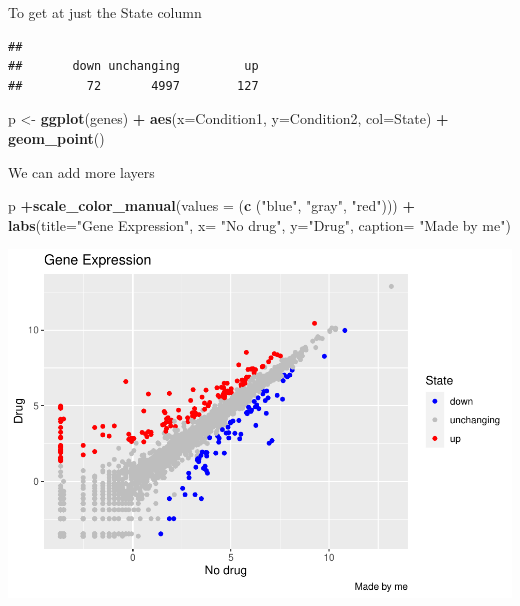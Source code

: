 \documentclass[
]{article}
\newenvironment{Shaded}{\begin{snugshade}}{\end{snugshade}}
\newcommand{\DataTypeTok}[1]{\textcolor[rgb]{0.13,0.29,0.53}{#1}}
\newcommand{\KeywordTok}[1]{\textcolor[rgb]{0.13,0.29,0.53}{\textbf{#1}}}
\newcommand{\NormalTok}[1]{#1}
\newcommand{\OperatorTok}[1]{\textcolor[rgb]{0.81,0.36,0.00}{\textbf{#1}}}
\newcommand{\StringTok}[1]{\textcolor[rgb]{0.31,0.60,0.02}{#1}}
\begin{document}
To get at just the State column

\begin{Shaded}
\end{Shaded}

\begin{verbatim}
## 
##       down unchanging         up 
##         72       4997        127
\end{verbatim}

\begin{Shaded}
\begin{Highlighting}[]
\NormalTok{p <-}\StringTok{ }\KeywordTok{ggplot}\NormalTok{(genes) }\OperatorTok{+}\StringTok{ }
\StringTok{    }\KeywordTok{aes}\NormalTok{(}\DataTypeTok{x=}\NormalTok{Condition1, }\DataTypeTok{y=}\NormalTok{Condition2, }\DataTypeTok{col=}\NormalTok{State) }\OperatorTok{+}
\StringTok{    }\KeywordTok{geom_point}\NormalTok{()}
\end{Highlighting}
\end{Shaded}

We can add more layers

\begin{Shaded}
\begin{Highlighting}[]
\NormalTok{p }\OperatorTok{+}\KeywordTok{scale_color_manual}\NormalTok{(}\DataTypeTok{values =}\NormalTok{ (}\KeywordTok{c}\NormalTok{ (}\StringTok{"blue"}\NormalTok{, }\StringTok{"gray"}\NormalTok{, }\StringTok{"red"}\NormalTok{))) }\OperatorTok{+}
\StringTok{  }\KeywordTok{labs}\NormalTok{(}\DataTypeTok{title=}\StringTok{"Gene Expression"}\NormalTok{,}
   \DataTypeTok{x=} \StringTok{"No drug"}\NormalTok{, }\DataTypeTok{y=}\StringTok{"Drug"}\NormalTok{,}
   \DataTypeTok{caption=} \StringTok{"Made by me"}\NormalTok{)}
\end{Highlighting}
\end{Shaded}

\includegraphics{class05_files/figure-latex/unnamed-chunk-13-1.pdf}
\end{document}
